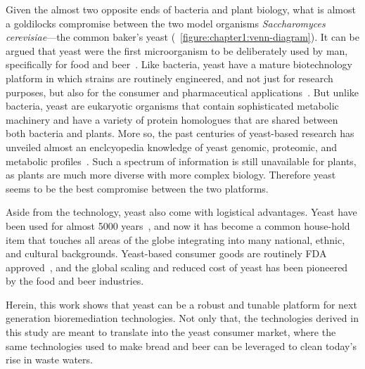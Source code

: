 \documentclass[../main/main]{subfiles}
\begin{document}
Given the almost two opposite ends of bacteria and plant biology, what is almost a goldilocks compromise between the two model organisms \textit{Saccharomyces cerevisiae}---the common baker's yeast (\FIGURE~\ref{figure:chapter1:venn-diagram}). It can be argued that yeast were the first microorganism to be deliberately used by man, specifically for food and beer~\cite{greig2009,spencer1997}. Like bacteria, yeast have a mature biotechnology platform in which strains are routinely engineered, and not just for research purposes, but also for the consumer and pharmaceutical applications~\cite{nielsen2013,chae2001}. But unlike bacteria, yeast are eukaryotic organisms that contain sophisticated metabolic machinery and have a variety of protein homologues that are shared between both bacteria and plants.
More so, the past centuries of yeast-based research has unveiled almost an enclcyopedia knowledge of yeast genomic, proteomic, and metabolic profiles~\cite{guthrie2002guide}. Such a spectrum of information is still unavailable for plants, as plants are much more diverse with more complex biology. Therefore yeast seems to be the best compromise between the two platforms.

Aside from the technology, yeast also come with logistical advantages. Yeast have been used for almost 5000 years~\cite{greig2009}, and now it has become a common house-hold item that touches all areas of the globe integrating into many national, ethnic, and cultural backgrounds. Yeast-based consumer goods are routinely FDA approved~\cite{nutrition2018,usda2014}, and the global scaling and reduced cost of yeast has been pioneered by the food and beer industries.

Herein, this work shows that yeast can be a robust and tunable platform for next generation bioremediation technologies. Not only that, the technologies derived in this study are meant to translate into the yeast consumer market, where the same technologies used to make bread and beer can be leveraged to clean today's rise in waste waters.

\printbibliography[title=References]
\end{document}
